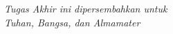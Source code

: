 \vspace*{\fill}
\begingroup
\centering
\textit{Tugas Akhir ini dipersembahkan untuk\\ Tuhan, Bangsa, dan Almamater}

\endgroup
\vspace*{\fill}